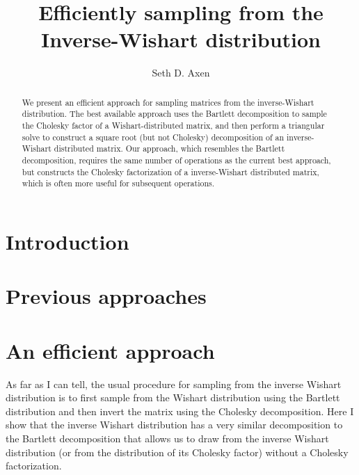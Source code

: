 \documentclass{article}
\title{Efficiently sampling from the Inverse-Wishart distribution}
\author[1]{Seth D. Axen}
\affil[1]{ML Colab}
\date{}
\begin{document}
\maketitle

\begin{abstract}
We present an efficient approach for sampling matrices from the inverse-Wishart distribution.
The best available approach uses the Bartlett decomposition to sample the Cholesky factor of a Wishart-distributed matrix, and then perform a triangular solve to construct a square root (but not Cholesky) decomposition of an inverse-Wishart distributed matrix.
Our approach, which resembles the Bartlett decomposition, requires the same number of operations as the current best approach, but constructs the Cholesky factorization of a inverse-Wishart distributed matrix, which is often more useful for subsequent operations.
\end{abstract}

\section{Introduction}





\section{Previous approaches}





\section{An efficient approach}

As far as I can tell, the usual procedure for sampling from the inverse Wishart distribution is to first sample from the Wishart distribution using the Bartlett distribution and then invert the matrix using the Cholesky decomposition.
Here I show that the inverse Wishart distribution has a very similar decomposition to the Bartlett decomposition that allows us to draw from the inverse Wishart distribution (or from the distribution of its Cholesky factor) without a Cholesky factorization.
\end{document}
